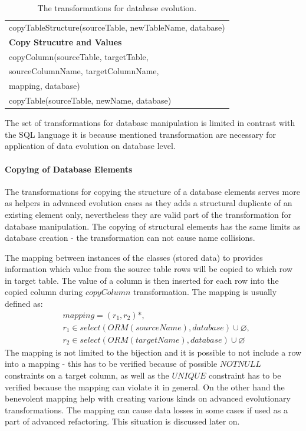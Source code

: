 \documentclass[11pt]{article}
\begin{document}
\begin{table}
\begin{tabular}{|l|}
	copyTableStructure(sourceTable, newTableName, database) \\
	\textbf{Copy Strucutre and Values} \\
	copyColumn(sourceTable, targetTable, \\
	\hspace{0.5in} sourceColumnName, targetColumnName, \\ 
	\hspace{0.5in} mapping, database) \\
	copyTable(sourceTable, newName, database) \\
	\hline
	\end{tabular}
	\caption{The transformations for database evolution.}
	\label{tab:db-basic-evolution}
\end{table}
The set of transformations for database manipulation is limited in contrast with the SQL language it is because mentioned transformation are necessary for application of data evolution on database level. 

\paragraph{Copying of Database Elements} The transformations for copying the structure of a database elements serves more as helpers in advanced evolution cases as they adds a structural duplicate of an existing element only, nevertheless they are valid part of the transformation for database manipulation.  The copying of structural elements has the same limits as database creation - the transformation can not cause name collisions. 

The mapping between instances of the classes (stored data) to provides information which value from the source table rows will be copied to which row in target table. The value of a column is then inserted for each row into the copied column during $copyColumn$ transformation. 
The mapping is usually defined as: 
\begin{align*}
&	mapping =  (r_1, r_2)*,\\
& 	r_1 \in select(ORM(sourceName), database) \cup \varnothing, \\
& 	r_2 \in select(ORM(targetName), database) \cup \varnothing
\end{align*}
The mapping is not limited to the bijection and it is possible to not include a row into a mapping - this has to be verified because of possible $NOTNULL$ constraints on a target column, as well as the $UNIQUE$ constraint has to be verified because the mapping can violate it in general. On the other hand the benevolent mapping help with creating various kinds on advanced evolutionary transformations. The mapping can cause data losses in some cases if used as a part of advanced refactoring. This situation is discussed later on. 
\end{document}
